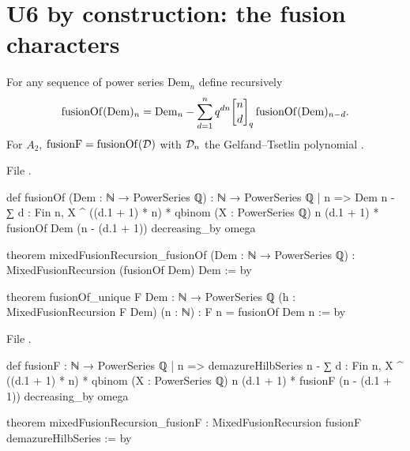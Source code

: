 \section{U6 by construction: the fusion characters}\label{l26:sec:u6}

\begin{definition}\label{l26:def:fusionOf}
For any sequence of power series $\mathrm{Dem}_n$ define recursively
\begin{equation*}
\mathrm{fusionOf}(\mathrm{Dem})_n=\mathrm{Dem}_n-\sum_{d=1}^{n}q^{dn}\ltwentysixqb nd\,\mathrm{fusionOf}(\mathrm{Dem})_{n-d}.
\end{equation*}
For $A_2$, $\mathrm{fusionF}=\mathrm{fusionOf}(\mathcal D)$ with $\mathcal D_n$ the Gelfand--Tsetlin polynomial
.
\end{definition}
\noindent File .
\begin{leancode}
def fusionOf (Dem : ℕ → PowerSeries ℚ) : ℕ → PowerSeries ℚ
  | n => Dem n -
      ∑ d : Fin n, X ^ ((d.1 + 1) * n) * qbinom (X : PowerSeries ℚ) n (d.1 + 1) *
        fusionOf Dem (n - (d.1 + 1))
decreasing_by omega

theorem mixedFusionRecursion_fusionOf (Dem : ℕ → PowerSeries ℚ) :
    MixedFusionRecursion (fusionOf Dem) Dem := by

theorem fusionOf_unique {F Dem : ℕ → PowerSeries ℚ} (h : MixedFusionRecursion F Dem) (n : ℕ) :
    F n = fusionOf Dem n := by
\end{leancode}
\noindent File .
\begin{leancode}
def fusionF : ℕ → PowerSeries ℚ
  | n => demazureHilbSeries n -
      ∑ d : Fin n, X ^ ((d.1 + 1) * n) * qbinom (X : PowerSeries ℚ) n (d.1 + 1) * fusionF (n - (d.1 + 1))
decreasing_by omega

theorem mixedFusionRecursion_fusionF : MixedFusionRecursion fusionF demazureHilbSeries := by
\end{leancode}

